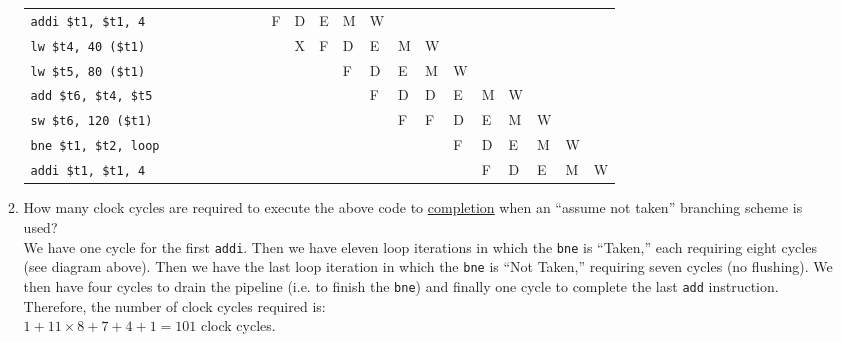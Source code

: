 \documentclass[11pt]{article}
\begin{document}
\begin{enumerate}
\begin{enumerate}
\begin{table}[ht]
{\begin{tabular}{@{}l|llllllllllllllllllll@{}}
\texttt{addi \$t1, \$t1, 4}   &   &   &   &   &   &   &   & F & D & E  & M  & W  &    &    &    &    &    &    &    &    \\
\texttt{lw \$t4, 40 (\$t1)}   &   &   &   &   &   &   &   &   & {\color[HTML]{FE0000}X} & F  & D  & E  & M  & W  &    &    &    &    &    &    \\
\texttt{lw \$t5, 80 (\$t1)}   &   &   &   &   &   &   &   &   &   &    & F  & D  & E  & M  & W  &    &    &    &    &    \\
\texttt{add \$t6, \$t4, \$t5}  &   &   &   &   &   &   &   &   &   &    &    & F  & {\color[HTML]{FE0000}D}  & D  & E  & M  & W  &    &    &    \\
\texttt{sw \$t6, 120 (\$t1)}  &   &   &   &   &   &   &   &   &   &    &    &    & F  & F  & D  & E  & M  & W  &    &    \\
\texttt{bne \$t1, \$t2, loop} &   &   &   &   &   &   &   &   &   &    &    &    &    &    & F  & D  & E  & M  & W  &    \\
\texttt{addi \$t1, \$t1, 4}   &   &   &   &   &   &   &   &   &   &    &    &    &    &    &    & F  & D  & E  & M  & W
\end{tabular}%
}
\end{table}
        \item How many clock cycles are required to execute the above code to \underline{completion} when an “assume not taken” branching scheme is used?\\[1em]
        We have one cycle for the first \texttt{addi}. Then we have eleven loop iterations in which the \texttt{bne} is “Taken,” each requiring eight cycles (see diagram above). Then we have the last loop iteration in which the \texttt{bne} is “Not Taken,” requiring seven cycles (no flushing). We then have four cycles to drain the pipeline (i.e. to finish the \texttt{bne}) and finally one cycle to complete the last \texttt{add} instruction. Therefore, the number of clock cycles required is:\\
        $1+11\times 8+7+4+1=101$ clock cycles.\\


\end{enumerate}
\end{enumerate}
\end{document}
